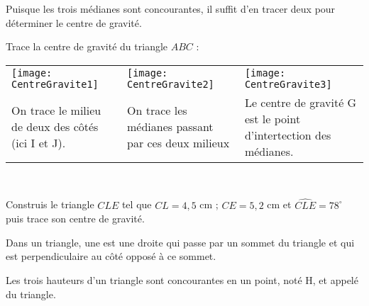 \begin{methode*1}

\begin{remarque}
Puisque les trois médianes sont concourantes, il suffit d'en tracer deux pour déterminer le centre de gravité.
 \end{remarque}

 \begin{exemple*1}
 Trace la centre de gravité du triangle $ABC$ :
 \begin{tabularx}{\textwidth}{X|X|X}
 \texttt{[image: CentreGravite1]} &  \texttt{[image: CentreGravite2]} & \texttt{[image: CentreGravite3]} \\ 
 On trace le milieu de deux des côtés (ici I et J). & On trace les médianes passant par ces deux milieux & Le centre de gravité G est le point d'intertection des médianes. \\
\end{tabularx} \\

\end{exemple*1}

 
\exercice
Construis le triangle $CLE$ tel que 
$CL = 4,5$ cm ; $CE = 5,2$ cm et $\widehat{CLE} = 78^\circ$ puis trace son centre de gravité.


\end{methode*1}



\newpage

\begin{definition}
Dans un triangle, une  est une droite qui passe par un sommet du triangle et qui est perpendiculaire au côté opposé à ce sommet.

Les trois hauteurs d'un triangle sont concourantes en un point, noté H, et appelé  du triangle.
\end{definition}

\vspace{2em}

